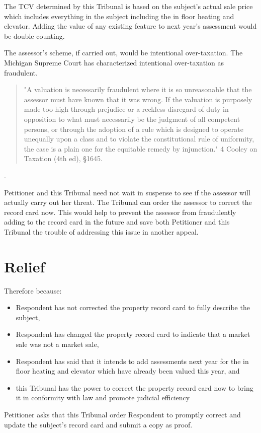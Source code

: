 \documentclass[12pt,\documentclassflag]{michiganCourtOfAppealsBrief}
\begin{document}
The TCV determined by this Tribunal is based on the subject's actual sale price which includes everything in the subject including the in floor heating and elevator. Adding the value of any existing feature to next year's assessment would be double counting.

The assessor's scheme, if carried out, would be intentional over-taxation. The Michigan Supreme Court has characterized intentional over-taxation as fraudulent.

\begin{quotation}
  "A valuation is necessarily fraudulent where it is so unreasonable that the assessor must have known that it was wrong. If the valuation is purposely made too high through prejudice or a reckless disregard of duty in opposition to what must necessarily be the judgment of all competent persons, or through the adoption of a rule which is designed to operate unequally upon a class and to violate the constitutional rule of uniformity, the case is a plain one for the equitable remedy by injunction." 4 Cooley on Taxation (4th ed), %
  \S 1645.
\end{quotation}
. 

Petitioner and this Tribunal need not wait in suspense to see if the assessor will actually carry out her threat. The Tribunal can order the assessor to correct the record card now. This would help to prevent the assessor from fraudulently adding to the record card in the future and save both Petitioner and this Tribunal the trouble of addressing this issue in another appeal.

\section{Relief}

Therefore because:

  \begin{itemize}
\item Respondent has not corrected the property record card to fully describe the subject,

\item Respondent has changed the property record card to indicate that a market sale was not a market sale,

\item Respondent has said that it intends to add assessments next year for the in floor heating and elevator which have already been valued this year, and
  
\item this Tribunal has the power to correct the property record card now to bring it in conformity with law and promote judicial efficiency
\end{itemize}
Petitioner asks that this Tribunal order Respondent to promptly correct and update the subject's record card and submit a copy as proof.
\end{document}
